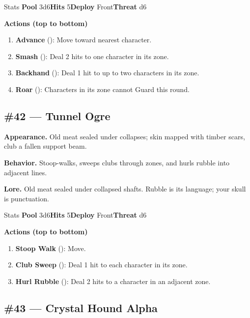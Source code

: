 \begin{monsterentry}{Stats}
\textbf{Pool} 3d6\quad\textbf{Hits} 5\quad\textbf{Deploy} Front\quad\textbf{Threat} d6

\textbf{Actions (top to bottom)}
\begin{enumerate}\setlength{\itemsep}{0.15em}\setlength{\parskip}{0pt}
  \item \textbf{Advance} (\easy): Move toward nearest character.
  \item \textbf{Smash} (\medium): Deal 2 hits to one character in its zone.
  \item \textbf{Backhand} (\hard): Deal 1 hit to up to two characters in its zone.
  \item \textbf{Roar} (\medium): Characters in its zone cannot Guard this round.
\end{enumerate}
\end{monsterentry}

\subsection*{\#42 --- Tunnel Ogre}

\textbf{Appearance.} Old meat sealed under collapses; skin mapped with timber scars, club a fallen support beam.

\textbf{Behavior.} Stoop-walks, sweeps clubs through zones, and hurls rubble into adjacent lines.

\textbf{Lore.} Old meat sealed under collapsed shafts. Rubble is its language; your skull is punctuation.

\begin{monsterentry}{Stats}
\textbf{Pool} 3d6\quad\textbf{Hits} 5\quad\textbf{Deploy} Front\quad\textbf{Threat} d6

\textbf{Actions (top to bottom)}
\begin{enumerate}\setlength{\itemsep}{0.15em}\setlength{\parskip}{0pt}
  \item \textbf{Stoop Walk} (\easy): Move.
  \item \textbf{Club Sweep} (\medium): Deal 1 hit to each character in its zone.
  \item \textbf{Hurl Rubble} (\hard): Deal 2 hits to a character in an adjacent zone.
\end{enumerate}
\end{monsterentry}

\subsection*{\#43 --- Crystal Hound Alpha}

